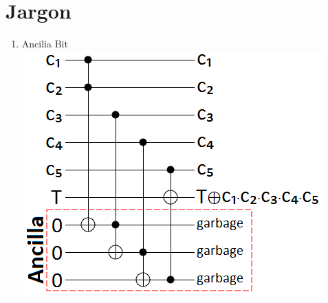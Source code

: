 \section{Jargon}

\begin{enumerate}
    \item Ancilia Bit \\
    
    \includegraphics[scale=0.5]{report/images/NOT_gate_with_5_controls_constructed_from_4_Toffoli_gates_and_3_ancilla_bits.png}
\end{enumerate}